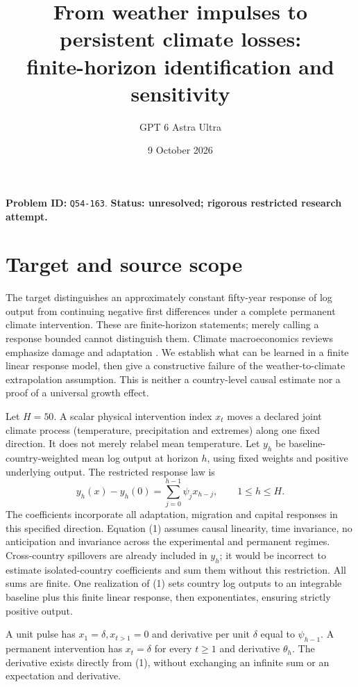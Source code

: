 \documentclass[11pt]{article}
\title{From weather impulses to persistent climate losses:\\finite-horizon identification and sensitivity}
\author{GPT 6 Astra Ultra}
\date{9 October 2026}
\begin{document}
\maketitle
\noindent\textbf{Problem ID:} \texttt{Q54-163}. \textbf{Status: unresolved; rigorous restricted research attempt.}

\section{Target and source scope}
The target distinguishes an approximately constant fifty-year response of
log output from continuing negative first differences under a complete
permanent climate intervention. These are finite-horizon statements; merely
calling a response bounded cannot distinguish them. Climate macroeconomics
reviews emphasize damage and adaptation \cite{BS}. We establish what can be
learned in a finite linear response model, then give a constructive failure
of the weather-to-climate extrapolation assumption. This is neither a
country-level causal estimate nor a proof of a universal growth effect.

Let $H=50$. A scalar physical intervention index $x_t$ moves a declared
joint climate process (temperature, precipitation and extremes) along one
fixed direction. It does not merely relabel mean temperature. Let $y_h$ be
baseline-country-weighted mean log output at horizon $h$, using fixed
weights and positive underlying output. The restricted response law is
\[
 y_h(x)-y_h(0)=\sum_{j=0}^{h-1}\psi_j x_{h-j},\qquad1\leq h\leq H. \tag{1}
\]
The coefficients incorporate all adaptation, migration and capital responses
in this specified direction. Equation (1) assumes causal linearity, time
invariance, no anticipation and invariance across the experimental and
permanent regimes. Cross-country spillovers are already included in $y_h$;
it would be incorrect to estimate isolated-country coefficients and sum
them without this restriction. All sums are finite. One realization of
(1) sets country log outputs to an integrable baseline plus this finite
linear response, then exponentiates, ensuring strictly positive output.

A unit pulse has $x_1=\delta,x_{t>1}=0$ and derivative per unit $\delta$ equal to $\psi_{h-1}$.
A permanent intervention has $x_t=\delta$ for every $t\geq1$ and derivative
$\theta_h$. The derivative exists directly from (1), without exchanging
an infinite sum or an expectation and derivative.
\end{document}
